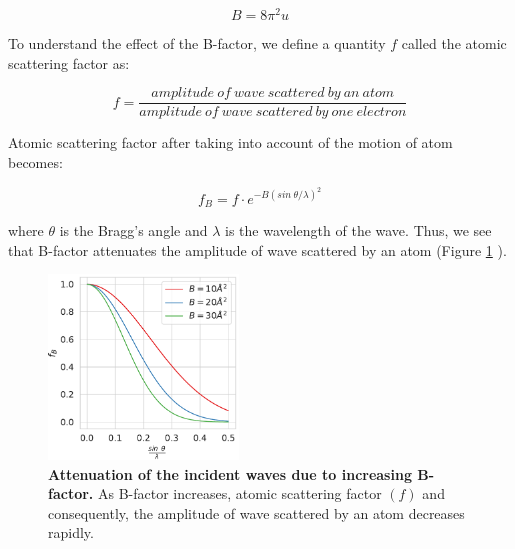 \begin{equation}
    B = 8\pi^2 u
    \label{eqn:bfactor}
\end{equation}

To understand the effect of the B-factor, we define a quantity $f$ called the atomic scattering factor as:

\begin{equation}
    f = \frac{amplitude\ of\ wave\ scattered\ by\ an\ atom}{amplitude\ of\ wave\ scattered\ by\ one\ electron}
\end{equation}

Atomic scattering factor after taking into account of the motion of atom becomes:

\begin{equation}
    f_B = f\cdot e^{-B(sin\ \theta /\lambda)^2}
\end{equation}

where $\theta$ is the Bragg's angle and $\lambda$ is the wavelength of the wave. Thus, we see that B-factor attenuates the amplitude of wave scattered by an atom (Figure \ref{fig:bfactors} ).


\begin{figure}
  \begin{center}
    \includegraphics[width=0.45\textwidth]{chapters/Introduction/Figures/bfactors.pdf}
    \caption[Attenuation of the incident waves due to increasing B-factor.]{\textbf{Attenuation of the incident waves due to increasing B-factor.} As B-factor increases, atomic scattering factor $(f)$ and consequently, the amplitude of wave scattered by an atom decreases rapidly.}%
    \label{fig:bfactors}
  \end{center}
\end{figure}

